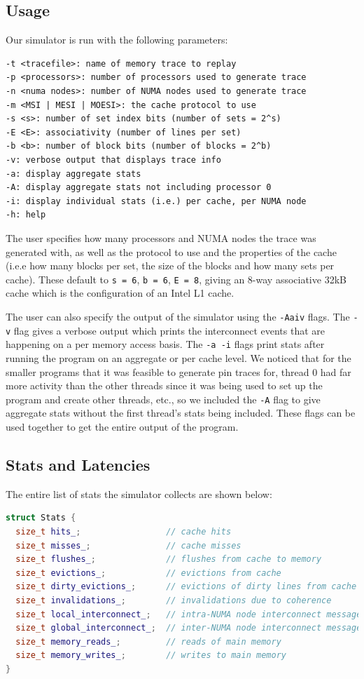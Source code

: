 \documentclass{article}
\begin{document}
\subsection{Usage}
Our simulator is run with the following parameters:
\begin{lstlisting}[numbers=none]
-t <tracefile>: name of memory trace to replay
-p <processors>: number of processors used to generate trace
-n <numa nodes>: number of NUMA nodes used to generate trace
-m <MSI | MESI | MOESI>: the cache protocol to use
-s <s>: number of set index bits (number of sets = 2^s)
-E <E>: associativity (number of lines per set)
-b <b>: number of block bits (number of blocks = 2^b)
-v: verbose output that displays trace info
-a: display aggregate stats
-A: display aggregate stats not including processor 0
-i: display individual stats (i.e.) per cache, per NUMA node
-h: help
\end{lstlisting}

The user specifies how many processors and NUMA nodes the trace was generated with, as well as the protocol to use and the properties of the cache (i.e.e how many blocks per set, the size of the blocks and how many sets per cache). These default to \texttt{s = 6}, \texttt{b = 6}, \texttt{E = 8}, giving an 8-way associative 32kB cache which is the configuration of an Intel L1 cache.

The user can also specify the output of the simulator using the \texttt{-Aaiv} flags. The \texttt{-v} flag gives a verbose output which prints the interconnect events that are happening on a per memory access basis. The \texttt{-a -i} flags print stats after running the program on an aggregate or per cache level.  We noticed that for the smaller programs that it was feasible to generate pin traces for, thread 0 had far more activity than the other threads since it was being used to set up the program and create other threads, etc., so we included the \texttt{-A} flag to give aggregate stats without the first thread's stats being included. These flags can be used together to get the entire output of the program.

\subsection{Stats and Latencies}
The entire list of stats the simulator collects are shown below:
\begin{lstlisting}[language=C++, numbers=none]
struct Stats {
  size_t hits_;                 // cache hits
  size_t misses_;               // cache misses
  size_t flushes_;              // flushes from cache to memory
  size_t evictions_;            // evictions from cache
  size_t dirty_evictions_;      // evictions of dirty lines from cache
  size_t invalidations_;        // invalidations due to coherence
  size_t local_interconnect_;   // intra-NUMA node interconnect messages
  size_t global_interconnect_;  // inter-NUMA node interconnect messages
  size_t memory_reads_;         // reads of main memory
  size_t memory_writes_;        // writes to main memory
}
\end{lstlisting}
\end{document}
